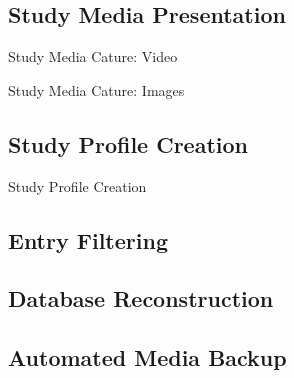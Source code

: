 \documentclass[17pt, aspectratio=169]{beamer}
\begin{document}
\subsection{Study Media Presentation}
\begin{frame}{Study Media Cature: Video}

\end{frame}
\begin{frame}{Study Media Cature: Images}

\end{frame}
\subsection{Study Profile Creation}
\begin{frame}{Study Profile Creation}
\end{frame}
\subsection{Entry Filtering}
\subsection{Database Reconstruction}
\subsection{Automated Media Backup}
\end{document}
